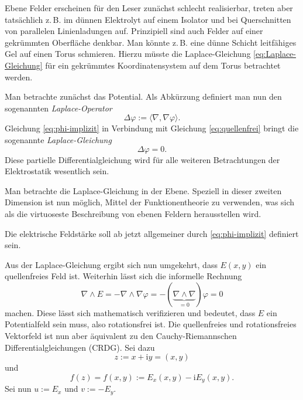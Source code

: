 \documentclass[a4paper,10pt,fleqn,twocolumn,twoside]{article}
\newcommand{\ui}{\mathrm i}
\begin{document}
Ebene Felder erscheinen für den Leser zunächst schlecht realisierbar,
treten aber tatsächlich z.\,B. im dünnen Elektrolyt auf einem
Isolator und bei Querschnitten von parallelen Linienladungen auf.
Prinzipiell sind auch Felder auf einer gekrümmten Oberfläche
denkbar. Man könnte z.\,B. eine dünne Schicht leitfähiges Gel
auf einen Torus schmieren. Hierzu müsste die Laplace-Gleichung
\eqref{eq:Laplace-Gleichung} für ein gekrümmtes Koordinatensystem
auf dem Torus betrachtet werden.

Man betrachte zunächst das Potential.
Als Abkürzung definiert man nun den sogenannten \emph{Laplace-Operator}
\begin{equation}
\Delta\varphi := \langle\nabla,\nabla\varphi\rangle.
\end{equation}
Gleichung
\eqref{eq:phi-implizit} in Verbindung mit Gleichung
\eqref{eq:quellenfrei} bringt die sogenannte \emph{Laplace-Gleichung}
\begin{equation}\label{eq:Laplace-Gleichung}
\Delta\varphi = 0.
\end{equation}
Diese partielle Differentialgleichung wird für alle weiteren
Betrachtungen der Elektrostatik wesentlich sein.

Man betrachte die Laplace-Gleichung in der Ebene.
Speziell in dieser zweiten Dimension ist nun möglich,
Mittel der Funktionentheorie zu verwenden,
was sich als die virtuoseste Beschreibung von ebenen Feldern
herausstellen wird.

Die elektrische Feldstärke soll ab jetzt allgemeiner durch
\eqref{eq:phi-implizit} definiert sein.

Aus der Laplace-Gleichung ergibt sich nun umgekehrt, dass $E(x,y)$
ein quellenfreies Feld ist. Weiterhin lässt sich die
informelle Rechnung
\begin{equation}
\nabla\wedge E
= -\nabla\wedge\nabla\varphi
= -(\underbrace{\nabla\wedge\nabla}_{=0})\varphi =0
\end{equation}
machen. Diese lässt sich mathematisch verifizieren und bedeutet,
dass $E$ ein Potentialfeld sein muss, also rotationsfrei ist.
Die quellenfreies und rotationsfreies Vektorfeld ist nun aber
äquivalent zu den Cauchy-Riemannschen Differentialgleichungen
(CRDG). Sei dazu
\begin{equation}
z:=x+\ui y=(x,y)
\end{equation}
und
\begin{equation}
f(z)=f(x,y):=E_x(x,y)-\mathrm{i}E_y(x,y).
\end{equation}
Sei nun $u:=E_x$ und $v:=-E_y$.
\end{document}
